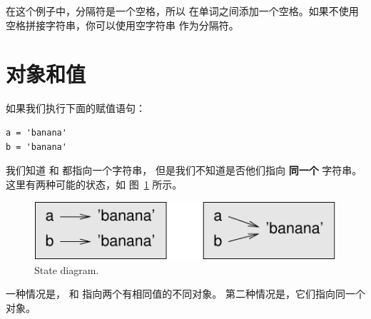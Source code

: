 %

在这个例子中，分隔符是一个空格，所以  在单词之间添加一个空格。如果不使用空格拼接字符串，你可以使用空字符串  作为分隔符。

  


\section{对象和值}
\label{equivalence}
  


如果我们执行下面的赋值语句：

\begin{lstlisting}
a = 'banana'
b = 'banana'
\end{lstlisting}

%

我们知道  和  都指向一个字符串， 但是我们不知道是否他们指向 {\bf 同一个} 字符串。 这里有两种可能的状态，如 图~\ref{fig.list1} 所示。


\begin{figure}
\centerline
{\includegraphics[scale=0.8]{../source/figs/list1.pdf}}
\caption{State diagram.}
\label{fig.list1}
\end{figure}


一种情况是， 和  指向两个有相同值的不同对象。
第二种情况是，它们指向同一个对象。

